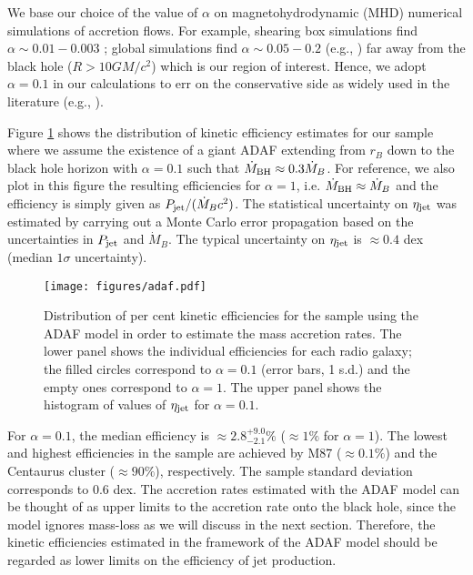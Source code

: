 \documentclass[useAMS,usenatbib]{mn2e}
\begin{document}
We base our choice of the value of $\alpha$ on magnetohydrodynamic (MHD) numerical simulations of accretion flows. For example, shearing box simulations find $\alpha \sim 0.01-0.003$ \citep{Hawley11}; global simulations find $\alpha \sim 0.05-0.2$ (e.g., \citealt{Hawley01, Penna13}) far away from the black hole ($R>10 GM/c^2$) which is our region of interest. 
Hence, we adopt $\alpha=0.1$ in our calculations to err on the conservative side as widely used in the literature (e.g., \citealt{Yuan14}). 

Figure \ref{fig:adaf} shows the distribution of kinetic efficiency estimates for our sample where we assume the existence of a giant ADAF extending from $r_B$ down to the black hole horizon with $\alpha=0.1$ such that $\dot{M}_{\rm BH} \approx 0.3 \dot{M}_B$. For reference, we also plot in this figure the resulting efficiencies for $\alpha=1$, i.e. $\dot{M}_{\rm BH} \approx \dot{M}_B$ \citep{Narayan11} and the efficiency is simply given as $P_{\rm jet}/(\dot{M}_B c^2)$. The statistical uncertainty on $\eta_{\rm jet}$ was estimated by carrying out a Monte Carlo error propagation based on the uncertainties in $P_{\rm jet}$ and $\dot{M}_B$. The typical uncertainty on $\eta_{\rm jet}$ is $\approx 0.4$ dex (median $1\sigma$ uncertainty).

\begin{figure}
\centering
\texttt{[image: figures/adaf.pdf]}
\caption{Distribution of per cent kinetic efficiencies for the sample using the ADAF model in order to estimate the mass accretion rates. The lower panel shows the individual efficiencies for each radio galaxy; the filled circles correspond to $\alpha=0.1$ (error bars, 1 s.d.) and the empty ones correspond to $\alpha=1$. The upper panel shows the histogram of values of $\eta_{\rm jet}$ for $\alpha=0.1$. }
\label{fig:adaf}
\end{figure}

For $\alpha=0.1$, the median efficiency is $\approx 2.8^{+9.0}_{-2.1}\%$ ($\approx 1\%$ for $\alpha=1$). 
The lowest and highest efficiencies in the sample are achieved by M87 ($\approx 0.1\%$) and the Centaurus cluster ($\approx 90 \%$), respectively. The sample standard deviation corresponds to 0.6 dex. The accretion rates estimated with the ADAF model can be thought of as upper limits to the accretion rate onto the black hole, since the model ignores mass-loss as we will discuss in the next section. Therefore, the kinetic efficiencies estimated in the framework of the ADAF model should be regarded as lower limits on the efficiency of jet production.
\end{document}
